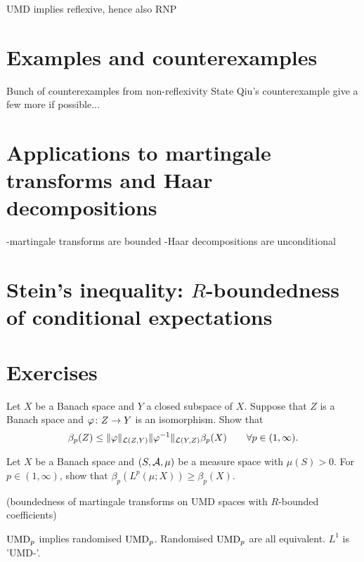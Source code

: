 UMD implies reflexive, hence also RNP

\section{Examples and counterexamples}

Bunch of counterexamples from non-reflexivity
State Qiu's counterexample
give a few more if possible...



\section{Applications to martingale transforms and Haar decompositions}

-martingale transforms are bounded
-Haar decompositions are unconditional

\section{Stein's inequality: $R$-boundedness of conditional expectations}




\section*{Exercises}

\begin{exercise}\label{ex:UMD-isomorphism}
  Let $X$ be a Banach space and $Y$ a closed subspace of $X$.
  Suppose that $Z$ is a Banach space and $\varphi \colon Z \rightarrow Y$ is an isomorphism.
  Show that 
  \begin{equation*}
    \beta_{p}(Z) \leq \|\varphi\|_{\mathcal{L}(Z,Y)} \|\varphi^{-1}\|_{\mathcal{L}(Y,Z)} \beta_{p}(X) \qquad \forall p \in (1,\infty).
  \end{equation*}
\end{exercise}

\begin{exercise}\label{ex:UMD-Lp-reverse}
  Let $X$ be a Banach space and $(S,\mathcal{A},\mu)$ be a measure space with $\mu(S) > 0$.
  For $p \in (1,\infty)$, show that $\beta_{p}(L^p(\mu;X)) \geq \beta_{p}(X)$.
\end{exercise}

\begin{exercise}
  (boundedness of martingale transforms on UMD spaces with $R$-bounded coefficients)
\end{exercise}

\begin{exercise}
  $\mathrm{UMD}_{p}$ implies randomised $\mathrm{UMD}_{p}$.
  Randomised $\mathrm{UMD}_{p}$ are all equivalent.
  $L^1$ is 'UMD-'.
\end{exercise}



